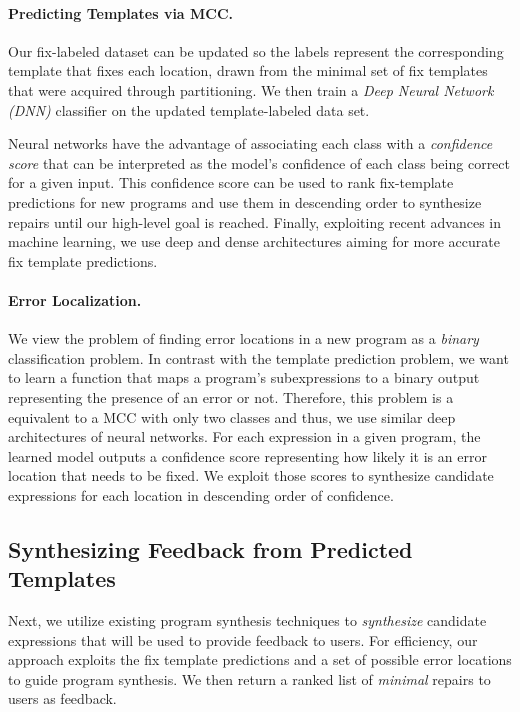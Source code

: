 \paragraph{Predicting Templates via MCC.}
Our fix-labeled dataset can be updated so the labels represent the corresponding
template that fixes each location, drawn from the minimal set of fix templates
that were acquired through partitioning. We then train a \emph{Deep Neural
Network (DNN)} classifier on the updated template-labeled data set.

Neural networks have the advantage of associating each class with a
\emph{confidence score} that can be interpreted as the model's confidence of
each class being correct for a given input. This confidence score can be used to
rank fix-template predictions for new programs and use them in descending order
to synthesize repairs until our high-level goal is reached. Finally, exploiting
recent advances in machine learning, we use deep and dense architectures
\citep{Schmidhuber_2015} aiming for more accurate fix template predictions.

\paragraph{Error Localization.} We view the problem of finding error locations
in a new program as a \emph{binary} classification problem. In contrast with the
template prediction problem, we want to learn a function that maps a program's
subexpressions to a binary output representing the presence of an error or not.
Therefore, this problem is a equivalent to a MCC with only two classes and thus,
we use similar deep architectures of neural networks. For each expression in a
given program, the learned model outputs a confidence score representing how
likely it is an error location that needs to be fixed. We exploit those scores
to synthesize candidate expressions for each location in descending order of
confidence.

\subsection{Synthesizing Feedback from Predicted Templates}
\label{sec:overview:synthesis}

Next, we utilize existing program synthesis techniques to \emph{synthesize}
candidate expressions that will be used to provide feedback to users. For
efficiency, our approach exploits the fix template predictions and a set of
possible error locations to guide program synthesis. We then return a ranked
list of \emph{minimal} repairs to users as feedback.

